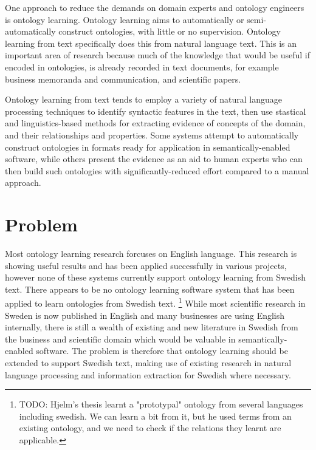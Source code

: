 \documentclass[a4paper]{report}
\newcommand{\todo}[1]{\footnote{{\color{red} TODO: #1}}}
\begin{document}
One approach to reduce the demands on domain experts and ontology engineers is ontology learning.
Ontology learning aims to automatically or semi-automatically construct ontologies, with little or no supervision.
Ontology learning from text specifically does this from natural language text.
This is an important area of research because much of the knowledge that would be useful if encoded in ontologies, is already recorded in text documents, for example business memoranda and communication, and scientific papers.

Ontology learning from text tends to employ a variety of natural language processing techniques to identify syntactic features in the text, then use stastical and linguistics-based methods for extracting evidence of concepts of the domain, and their relationships and properties.
Some systems attempt to automatically construct ontologies in formats ready for application in semantically-enabled software, while others present the evidence as an aid to human experts who can then build such ontologies with significantly-reduced effort compared to a manual approach.

\section{Problem}

Most ontology learning research forcuses on English language.
This research is showing useful results and has been applied successfully in various projects, however none of these systems currently support ontology learning from Swedish text.
There appears to be no ontology learning software system that has been applied to learn ontologies from Swedish text.
\todo{Hjelm's thesis\cite{Hjelm09Thesis} learnt a "prototypal" ontology from several languages including swedish.
We can learn a bit from it, but he used terms from an existing ontology, and we need to check if the relations they learnt are applicable.}
While most scientific research in Sweden is now published in English and many businesses are using English internally, there is still a wealth of existing and new literature in Swedish from the business and scientific domain which would be valuable in semantically-enabled software.
The problem is therefore that ontology learning should be extended to support Swedish text, making use of existing research in natural language processing and information extraction for Swedish where necessary.
 
\end{document}

